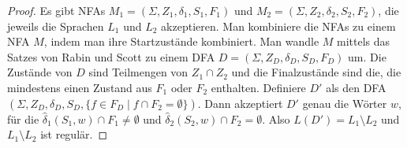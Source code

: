 \documentclass[10pt,a4paper]{article}
\begin{document}
\begin{proof}
  Es gibt NFAs $M_{1} = (\Sigma, Z_{1}, \delta_{1}, S_{1}, F_{1})$ und $M_{2} = (\Sigma, Z_{2}, \delta_{2}, S_{2}, F_{2})$, die jeweils die Sprachen $L_{1}$ und $L_{2}$ akzeptieren.
  Man kombiniere die NFAs zu einem NFA $M$, indem man ihre Startzustände kombiniert.
  Man wandle $M$ mittels das Satzes von Rabin und Scott zu einem DFA $D = (\Sigma, Z_{D}, \delta_{D}, S_{D}, F_{D})$ um.
  Die Zustände von $D$ sind Teilmengen von $Z_{1} \cap Z_{2}$ und die Finalzustände sind die, die mindestens einen Zustand aus $F_{1}$ oder $F_{2}$ enthalten.
  Definiere $D'$ als den DFA $(\Sigma, Z_{D}, \delta_{D}, S_{D}, \{ f \in F_{D} \mid f \cap F_{2} = \emptyset \})$.
  Dann akzeptiert $D'$ genau die Wörter $w$, für die $\hat{\delta}_{1}(S_{1}, w) \cap F_{1} \ne \emptyset$ und $\hat{\delta}_{2}(S_{2}, w) \cap F_{2} = \emptyset$.
  Also $L(D') = L_{1} \setminus L_{2}$ und $L_{1} \setminus L_{2}$ ist regulär.
\end{proof}
\end{document}
